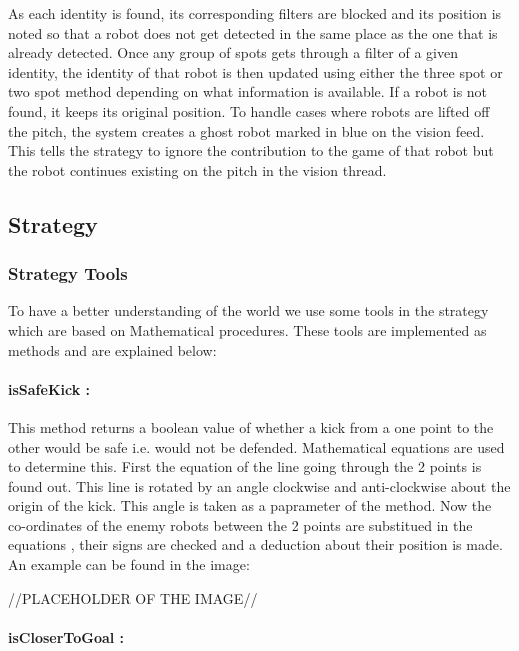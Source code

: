 \documentclass[a4paper,12pt]{article}
\begin{document}
\medskip

As each identity is found, its corresponding filters are blocked and its position is noted so that a robot does not get detected in the same place as the one that is already detected. Once any group of spots gets through a filter of a given identity, the identity of that robot is then updated using either the three spot or two spot method depending on what information is available. If a robot is not found, it keeps its original position. To handle cases where robots are lifted off the pitch, the system creates a ghost robot marked in blue on the vision feed. This tells the strategy to ignore the contribution to the game of that robot but the robot continues existing on the pitch in the vision thread.

\subsection{Strategy}

\subsubsection{Strategy Tools}

To have a better understanding of the world we use some tools in the strategy which are based on Mathematical procedures. These tools are implemented as methods and are explained below:

\paragraph{isSafeKick : }

This method returns a boolean value of whether a kick from a one point to the other would be safe i.e. would not be defended. Mathematical equations are used to determine this. First the equation of the line going through the 2 points is found out. This line is rotated by an angle clockwise and anti-clockwise about the origin of the kick. This angle is taken as a paprameter of the method. Now the co-ordinates of the  enemy robots between the 2 points are substitued in the equations , their signs are checked and a deduction about their position is made. An example can be found in the image:

//PLACEHOLDER OF THE IMAGE//

\paragraph {isCloserToGoal : }
\end{document}
